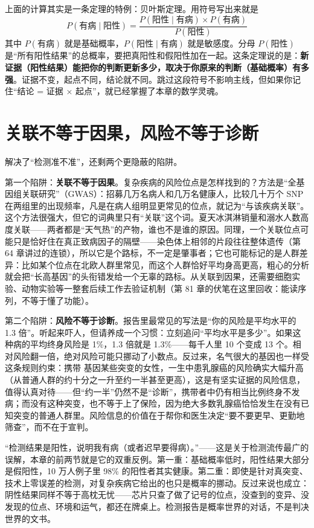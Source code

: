 \begin{tiaozhan}
上面的计算其实是一条定理的特例：贝叶斯定理。用符号写出来就是
\[P(\text{有病} \mid \text{阳性}) = \frac{P(\text{阳性} \mid \text{有病}) \times P(\text{有病})}{P(\text{阳性})}\]
其中 $P(\text{有病})$ 就是基础概率，$P(\text{阳性} \mid \text{有病})$ 就是敏感度。分母 $P(\text{阳性})$ 是“所有阳性结果”的总概率，要把真阳性和假阳性加在一起。这条定理说的是：\textbf{新证据（阳性结果）能把你的判断更新多少，取决于你原来的判断（基础概率）有多强}。证据不变，起点不同，结论就不同。跳过这段符号不影响主线，但如果你记住“结论 = 证据 × 起点”，就已经掌握了本章的数学灵魂。
\end{tiaozhan}

\section{关联不等于因果，风险不等于诊断}

解决了“检测准不准”，还剩两个更隐蔽的陷阱。

第一个陷阱：\textbf{关联不等于因果}。复杂疾病的风险位点是怎样找到的？方法是“全基因组关联研究”（GWAS）：招募几万名病人和几万名健康人，比较几十万个 SNP 在两组里的出现频率，凡是在病人组明显更常见的位点，就记为“与该疾病关联”。这个方法很强大，但它的词典里只有“关联”这个词。夏天冰淇淋销量和溺水人数高度关联——两者都是“天气热”的产物，谁也不是谁的原因。同理，一个关联位点可能只是恰好住在真正致病因子的隔壁——染色体上相邻的片段往往整体遗传（第 64 章讲过的连锁），所以它是个路标，不一定是肇事者；它也可能标记的是人群差异：比如某个位点在北欧人群里常见，而这个人群恰好平均身高更高，粗心的分析就会把“长高基因”的头衔错发给一个无辜的路标。从关联到因果，还需要细胞实验、动物实验等一整套后续工作去验证机制（第 81 章的伏笔在这里回收：能读序列，不等于懂了功能）。

第二个陷阱：\textbf{风险不等于诊断}。报告里最常见的写法是“你的风险是平均水平的 1.3 倍”。听起来吓人，但请养成一个习惯：立刻追问“平均水平是多少”。如果这种病的平均终身风险是 1\%，1.3 倍就是 1.3\%——每千人里 10 个变成 13 个。相对风险翻一倍，绝对风险可能只挪动了小数点。反过来，名气很大的基因也一样受这条规则约束：携带  基因某些突变的女性，一生中患乳腺癌的风险确实大幅升高（从普通人群的约十分之一升至约一半甚至更高），这是有坚实证据的风险信息，值得认真对待——但“约一半”仍然不是“诊断”，携带者中仍有相当比例终身不发病；而没有这种突变，也不等于上了保险，因为绝大多数乳腺癌恰恰发生在没有已知突变的普通人群里。风险信息的价值在于帮你和医生决定“要不要更早、更勤地筛查”，而不在于宣判。

\begin{wuqu}
“检测结果是阳性，说明我有病（或者迟早要得病）。”——这是关于检测流传最广的误解，本章的前两节就是它的双重反例。第一重：基础概率低时，阳性结果大部分是假阳性，10 万人例子里 98\% 的阳性者其实健康。第二重：即使是针对真突变、技术上零误差的检测，对复杂疾病它给出的也只是概率的挪动。反过来说也成立：阴性结果同样不等于高枕无忧——芯片只查了做了记号的位点，没查到的变异、没发现的位点、环境和运气，都还在牌桌上。检测报告是概率世界的对话，不是判决世界的文书。
\end{wuqu}

